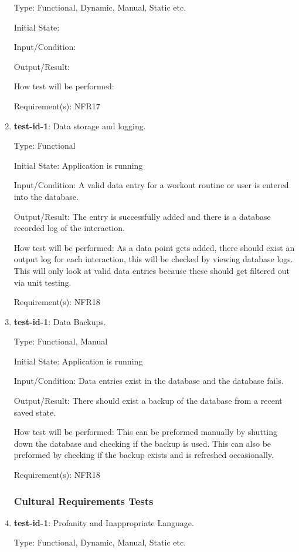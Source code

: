 \documentclass[12pt, titlepage]{article}
\begin{document}
\begin{enumerate}
		Type: Functional, Dynamic, Manual, Static etc.
		
		Initial State: 
		
		Input/Condition: 
		
		Output/Result: 
		
		How test will be performed: 
		
		Requirement(s): NFR17
		
		\item{\textbf{test-id-1}}: Data storage and logging.
		
		Type: Functional
		
		Initial State: Application is running 
		
		Input/Condition: A valid data entry for a workout routine or user is entered into the database.
		
		Output/Result: The entry is successfully added and there is a database recorded log of the interaction.
		
		How test will be performed: As a data point gets added, there should exist an output log for each interaction, this will be checked by viewing database logs. This will only look at valid data entries because these should get filtered out via unit testing.
		
		Requirement(s): NFR18
		
		\item{\textbf{test-id-1}}: Data Backups.
		
		Type: Functional, Manual
		
		Initial State: Application is running
		
		Input/Condition: Data entries exist in the database and the database fails.
		
		Output/Result: There should exist a backup of the database from a recent saved state.
		
		How test will be performed: This can be preformed manually by shutting down the database and checking if the backup is used. This can also be preformed by checking if the backup exists and is refreshed occasionally.
		
		Requirement(s): NFR18
	\subsubsection{Cultural Requirements Tests}
		\item{\textbf{test-id-1}}: Profanity and Inappropriate Language.
		
		Type: Functional, Dynamic, Manual, Static etc.
		

\end{enumerate}
\end{document}
